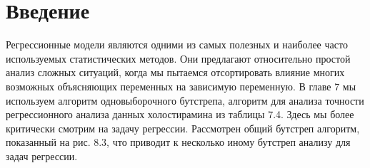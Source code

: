 \section{Введение}

Регрессионные модели являются одними из самых полезных и наиболее часто используемых статистических методов. Они предлагают относительно простой анализ сложных ситуаций, когда мы пытаемся отсортировать влияние многих возможных объясняющих переменных на зависимую переменную. В главе 7 мы используем алгоритм одновыборочного бутстрепа, алгоритм для анализа точности регрессионного анализа данных холостирамина из таблицы 7.4. Здесь мы более критически смотрим на задачу регрессии. Рассмотрен общий бутстреп алгоритм, показанный на рис. 8.3, что приводит к несколько иному бутстреп анализу для задач регрессии.